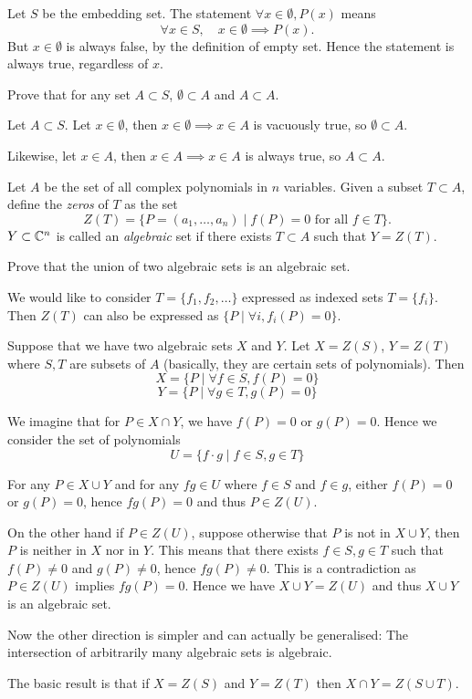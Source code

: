 \begin{solution}
Let $S$ be the embedding set. 
The statement $\forall x\in\emptyset, P(x)$ means
\[\forall x\in S,\quad x\in\emptyset\implies P(x).\]
But $x\in\emptyset$ is always false, by the definition of empty set. Hence the statement is always true, regardless of $x$.
\end{solution}

\begin{exercise}
Prove that for any set $A\subset S$, $\emptyset\subset A$ and $A\subset A$.
\end{exercise}

\begin{solution}
Let $A\subset S$. Let $x\in\emptyset$, then $x\in\emptyset\implies x\in A$ is vacuously true, so $\emptyset\subset A$.

Likewise, let $x\in A$, then $x\in A\implies x\in A$ is always true, so $A\subset A$.
\end{solution}

\begin{exercise}
Let $A$ be the set of all complex polynomials in $n$ variables. Given a subset $T\subset A$, define the \emph{zeros} of $T$ as the set
\[Z(T)=\{P=(a_1,\dots,a_n)\mid f(P)=0 \text{ for all }f\in T\}.\]
$Y\subset\mathbb C^n$ is called an \emph{algebraic} set if there exists $T \subset A$ such that $Y=Z(T)$.

Prove that the union of two algebraic sets is an algebraic set.
\end{exercise}

\begin{solution}
We would like to consider $T=\{f_1, f_2, \dots\}$ expressed as indexed sets $T=\{f_i\}$. Then $Z(T)$ can also be expressed as $\{P \mid \forall i, f_i(P)=0\}$.

Suppose that we have two algebraic sets $X$ and $Y$. Let $X=Z(S)$, $Y=Z(T)$ where $S,T$ are subsets of $A$ (basically, they are certain sets of polynomials). Then
\[ X=\{P \mid \forall f \in S, f(P)=0\} \]
\[ Y=\{P \mid \forall g \in T, g(P)=0\} \]

We imagine that for $P\in X\cap Y$, we have $f(P)=0$ or $g(P)=0$. Hence we consider the set of polynomials
\[ U=\{f\cdot g \mid f\in S, g\in T\} \]

For any $P\in X\cup Y$ and for any $fg\in U$ where $f\in S$ and $f\in g$, either $f(P)=0$ or $g(P)=0$, hence $fg(P)=0$ and thus $P\in Z(U)$.

On the other hand if $P\in Z(U)$, suppose otherwise that $P$ is not in $X\cup Y$, then $P$ is neither in $X$ nor in $Y$. This means that there exists $f\in S,g\in T$ such that $f(P)\neq0$ and $g(P)\neq0$, hence $fg(P)\neq0$. This is a contradiction as $P\in Z(U)$ implies $fg(P)=0$. Hence we have $X\cup Y=Z(U)$ and thus $X\cup Y$ is an algebraic set.

Now the other direction is simpler and can actually be generalised: The intersection of arbitrarily many algebraic sets is algebraic. 

The basic result is that if $X=Z(S)$ and $Y=Z(T)$ then $X\cap Y=Z(S\cup T)$. 
\end{solution}

